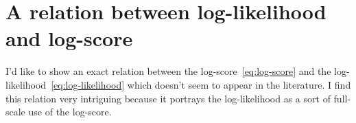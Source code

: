 \documentclass[\ifafour a4paper,12pt,\else a5paper,10pt,\fi%
onecolumn,oneside,article,%
british%
]{memoir}
\theoremstyle{remark}
\theoremstyle{innote}
\newcommand*{\citep}{\footcites}
\newcommand*{\p}{\mathrm{P}}%
\renewcommand*{\|}[1][]{\nonscript\,#1\vert\nonscript\;\mathopen{}}
\newcommand*{\yK}{I}
\begin{document}

\section{A relation between log-likelihood and log-score}
\label{sec:relation}

I'd like to show an exact relation between the log-score~\eqref{eq:log-score} and
the log-likelihood~\eqref{eq:log-likelihood} which doesn't seem to appear
in the literature. I find this relation very intriguing because it portrays
the log-likelihood as a sort of full-scale use of the log-score.%



\bigskip
\end{document}
